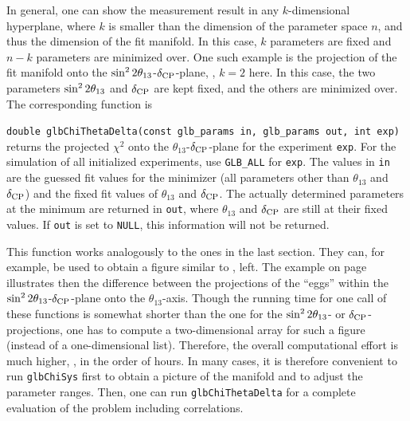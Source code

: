 In general, one can show the measurement result in any $k$-dimensional hyperplane, where $k$ is smaller than the dimension of the parameter space $n$, and thus the dimension of the fit manifold. In this case, $k$ parameters are fixed and $n-k$ parameters are minimized over. One such example is the projection of the fit manifold onto the $\sin^2 2 \theta_{13}$-$\delta_{\mathrm{CP}}$-plane, \ie, $k=2$ here. In this case, the two
parameters $\sin^2 2 \theta_{13}$ and $\delta_{\mathrm{CP}}$ are kept fixed, and the others are
minimized over. 
The corresponding function is 
\begin{function}
{\tt double glbChiThetaDelta(const glb\_params in, glb\_params out, int exp)} returns the projected $\chi^2$ onto the $\theta_{13}$-$\delta_{\mathrm{CP}}$-plane for the  experiment {\tt exp}. For the simulation of all initialized experiments,
use {\tt GLB\_ALL} for {\tt exp}. The values in {\tt in} are the guessed fit values for the minimizer (all parameters other than $\theta_{13}$ and $\delta_{\mathrm{CP}}$) and the fixed fit values of $\theta_{13}$ and $\delta_{\mathrm{CP}}$. The actually determined parameters at the minimum are returned in {\tt out}, where $\theta_{13}$ and $\delta_{\mathrm{CP}}$ are still at their fixed values. If {\tt out} is set to {\tt NULL}, this information will not be returned.
\end{function}
This function works analogously to the ones in the last section. They can, for example, be used to obtain a figure similar to , left.
The example on page~\pageref{ex:corrproj} illustrates then the difference
between the projections of the ``eggs'' within the 
$\sin^2 2 \theta_{13}$-$\delta_{\mathrm{CP}}$-plane onto the $\theta_{13}$-axis. 
Though the running time for one call of these functions is somewhat 
shorter than the one for the $\sin^2 2 \theta_{13}$- or $\delta_{\mathrm{CP}}$-projections, one 
has to compute a two-dimensional array for such a figure (instead of a 
one-dimensional list). Therefore, the overall computational effort is 
much higher, \ie, in the order of hours. In many cases, it is therefore
convenient to run {\tt glbChiSys} first to obtain a picture of
the manifold and to adjust the parameter ranges. Then, one can run
{\tt glbChiThetaDelta} for a complete evaluation of the problem
including correlations.

